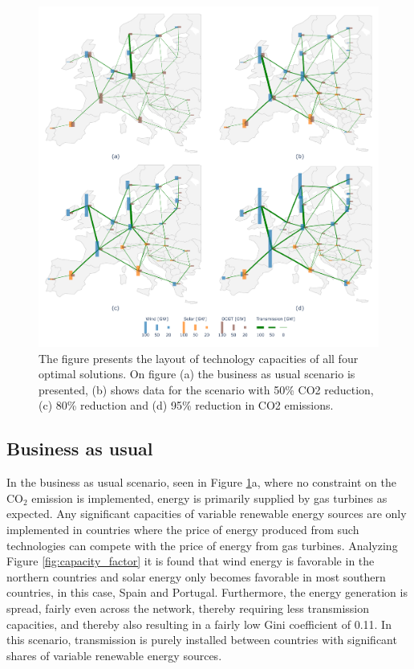 \begin{figure}[h]\centerfloat
	\includegraphics[width=1.2\textwidth]{./Images/Optimal_solutions}
	\caption{The figure presents the layout of technology capacities of all four optimal solutions. On figure (a) the business as usual scenario is presented, (b) shows data for the scenario with 50\% CO2 reduction, (c) 80\% reduction and (d) 95\% reduction in CO2 emissions.}
	\label{fig:Optimal_Solutions}
\end{figure}

\subsection{Business as usual}
In the business as usual scenario, seen in Figure \ref{fig:Optimal_Solutions}a, where no constraint on the $\text{CO}_2$ emission is implemented, energy is primarily supplied by gas turbines as expected. Any significant capacities of variable renewable energy sources are only implemented in countries where the price of energy produced from such technologies can compete with the price of energy from gas turbines. Analyzing Figure \ref{fig:capacity_factor} it is found that wind energy is favorable in the northern countries and solar energy only becomes favorable in most southern countries, in this case, Spain and Portugal. 
Furthermore, the energy generation is spread, fairly even across the network, thereby requiring less transmission capacities, and thereby also resulting in a fairly low Gini coefficient of 0.11. In this scenario, transmission is purely installed between countries with significant shares of variable renewable energy sources. 

